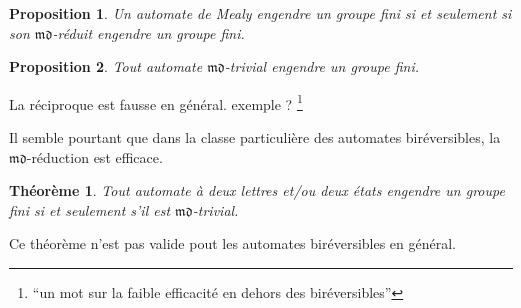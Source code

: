 \documentclass[11pt,a4paper]{article}
\newtheorem{prop}{Proposition}
\newtheorem{thm}{Théorème}
\begin{document}
\begin{prop}
  \label{prop:md-trivial}
  Un automate de Mealy engendre un groupe fini si et seulement si son $\mathfrak{md}$-réduit engendre un groupe fini.
\end{prop}

\begin{prop}
  Tout automate $\mathfrak{md}$-trivial engendre un groupe fini.
\end{prop}

La réciproque est fausse en général. exemple ? \footnote{``un mot sur la faible efficacité en dehors des biréversibles''}

Il semble pourtant que dans la classe particulière des automates biréversibles, la $\mathfrak{md}$-réduction est efficace.

\begin{thm}{\cite{Klimann13}}
  \label{thm:K}
  Tout automate à deux lettres et/ou deux états engendre un groupe fini si et seulement s'il est $\mathfrak{md}$-trivial.
\end{thm}

Ce théorème n'est pas valide pout les automates biréversibles en général.
\end{document}
